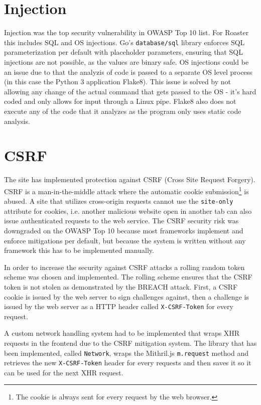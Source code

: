\documentclass[12pt,a4paper]{report}
\begin{document}
\section{Injection}
Injection was the top security vulnerability in OWASP Top 10 list\cite{owasp-top-10}. For Roaster this includes SQL and OS injections. Go's \texttt{database/sql} library enforces SQL parameterization per default with placeholder parameters\cite{go-database-sql}, ensuring that SQL injections are not possible, as the values are binary safe. OS injections could be an issue due to that the analyzis of code is passed to a separate OS level process (in this case the Python 3 application Flake8). This issue is solved by not allowing any change of the actual command that gets passed to the OS - it's hard coded and only allows for input through a Linux pipe. Flake8 also does not execute any of the code that it analyzes as the program only uses static code analysis\cite{pyflakes}\cite{mccabe}\cite{pycodestyle}.

\section{CSRF}
\label{subsec:csrf}
The site has implemented protection against CSRF (Cross Site Request Forgery). CSRF is a man-in-the-middle attack where the automatic cookie submission\footnote{The cookie is always sent for every request by the web browser.} is abused. A site that utilizes cross-origin requests cannot use the \texttt{site-only} attribute for cookies, i.e. another malicious website open in another tab can also issue authenticated requests to the web service\cite{rick}. The CSRF security risk was downgraded on the OWASP Top 10 because most frameworks implement and enforce mitigations per default\cite{owasp-top-10}, but because the system is written without any framework this has to be implemented manually.

In order to increase the security against CSRF attacks a rolling random token scheme was chosen and implemented. The rolling scheme ensures that the CSRF token is not stolen as demonstrated by the BREACH attack\cite{breach}. First, a CSRF cookie is issued by the web server to sign challenges against, then a challenge is issued by the web server as a HTTP header called \texttt{X-CSRF-Token} for every request.

A custom network handling system had to be implemented that wraps XHR requests in the frontend due to the CSRF mitigation system.  The library that has been implemented, called \texttt{Network}\cite{roaster-network}, wraps the Mithril.js \texttt{m.request} method and retrieves the new \texttt{X-CSRF-Token} header for every requests and then saves it so it can be used for the next XHR request.
\end{document}
